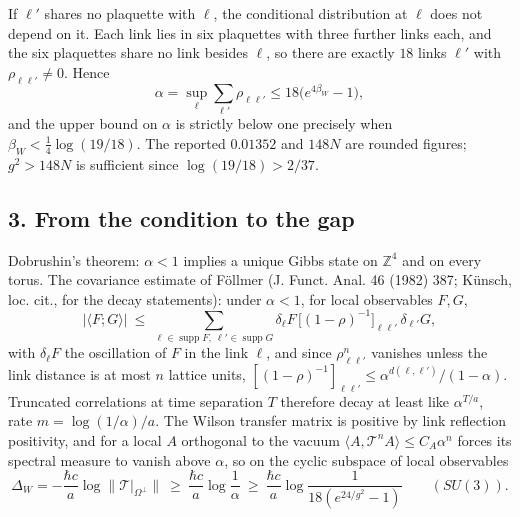 \documentclass[11pt,a4paper]{article}
\begin{document}
If \(\ell'\) shares no plaquette with \(\ell\), the conditional
distribution at \(\ell\) does not depend on it. Each link lies in six
plaquettes with three further links each, and the six plaquettes share
no link besides \(\ell\), so there are exactly \(18\) links \(\ell'\)
with \(\rho_{\ell\ell'}\ne0\). Hence
\[\alpha=\sup_\ell\sum_{\ell'}\rho_{\ell\ell'}\le18\big(e^{4\beta_W}-1\big),\]
and the upper bound on \(\alpha\) is strictly below one precisely when
\(\beta_W<\tfrac14\log(19/18)\). The reported \(0.01352\) and \(148N\)
are rounded figures; \(g^2>148N\) is sufficient since
\(\log(19/18)>2/37\).

\hypertarget{from-the-condition-to-the-gap}{%
\subsection{3. From the condition to the
gap}\label{from-the-condition-to-the-gap}}

Dobrushin's theorem: \(\alpha<1\) implies a unique Gibbs state on
\(\mathbb Z^4\) and on every torus. The covariance estimate of Föllmer
(J. Funct. Anal. 46 (1982) 387; Künsch, loc. cit., for the decay
statements): under \(\alpha<1\), for local observables \(F,G\),
\[|\langle F;G\rangle|\ \le\ \sum_{\ell\in\operatorname{supp}F,\ \ell'\in\operatorname{supp}G}\delta_\ell F\,\big[(1-\rho)^{-1}\big]_{\ell\ell'}\,\delta_{\ell'}G ,\]
with \(\delta_\ell F\) the oscillation of \(F\) in the link \(\ell\),
and since \(\rho^n_{\ell\ell'}\) vanishes unless the link distance is at
most \(n\) lattice units,
\([(1-\rho)^{-1}]_{\ell\ell'}\le\alpha^{d(\ell,\ell')}/(1-\alpha)\).
Truncated correlations at time separation \(T\) therefore decay at least
like \(\alpha^{T/a}\), rate \(m=\log(1/\alpha)/a\). The Wilson transfer
matrix is positive by link reflection positivity, and for a local \(A\)
orthogonal to the vacuum
\(\langle A,\mathcal T^nA\rangle\le C_A\alpha^n\) forces its spectral
measure to vanish above \(\alpha\), so on the cyclic subspace of local
observables
\[\Delta_W=-\frac{\hbar c}{a}\log\|\mathcal T|_{\Omega^\perp}\|\ \ge\ \frac{\hbar c}{a}\log\frac1\alpha
\ \ge\ \frac{\hbar c}{a}\log\frac{1}{18(e^{24/g^2}-1)}\qquad(SU(3)).\]
\end{document}
